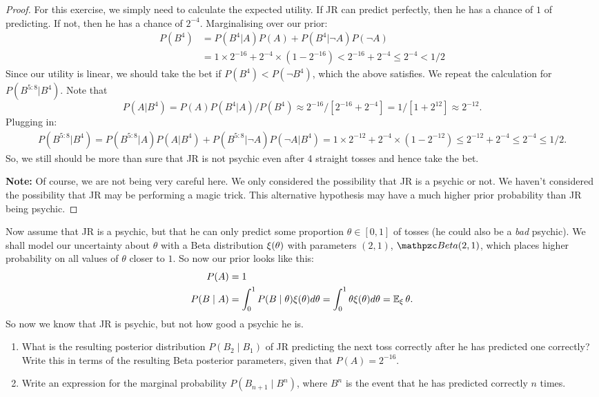 \documentclass[twoside,a4paper]{article}
\begin{document}
\begin{proof}
  For this exercise, we simply need to calculate the expected utility. If JR can predict perfectly, then he has a chance of $1$ of predicting. If not, then he has a chance of $2^{-4}$. Marginalising over our prior:
  \begin{align*}
    P(B^4) &= P(B^4 | A) P(A) + P(B^4 | \neg A) P(\neg A)\\
             &=  1 \times 2^{-16} + 2^{-4} \times (1 - 2^{-16}) < 2^{-16} + 2^{-4} \leq 2^{-4} < 1/2
  \end{align*}
  Since our utility is linear, we should take the bet if $P(B^4) < P(\neg B^{4})$, which the above satisfies. We repeat the calculation for $P(B^{5:8} | B^4)$. Note that
  \[
    P(A | B^4) = P(A) P(B^4 | A) / P(B^4) \approx 2^{-16} /[2^{-16} + 2^{-4}] = 1 / [1 + 2^{12}] \approx 2^{-12}.
  \]
  Plugging in:
  \begin{align*}
    P(B^{5:8} | B^4) = P(B^{5:8} | A) P(A | B^4) + P(B^{5:8} | \neg A) P(\neg A | B^4) =  1 \times 2^{-12} + 2^{-4} \times (1 - 2^{-12}) \leq 2^{-12} + 2^{-4} \leq 2^{-4} \leq 1/2.
  \end{align*}
  So, we still should be more than sure that JR is not psychic even after 4 straight tosses and hence take the bet.

  \textbf{Note:} Of course, we are not being very careful here. We only considered the possibility that JR is a psychic or not. We haven't considered the possibility that JR may be performing a magic trick. This alternative hypothesis may have a much higher prior probability than JR being psychic.
  
\end{proof}

\begin{exercise}
  Now assume that JR is a psychic, but that he can only predict some proportion $\theta \in [0,1]$ of tosses (he could also be a \emph{bad} psychic).
We shall model our uncertainty about $\theta$ with a Beta distribution $\xi(\theta)$ with parameters $(2, 1)$, $\Beta(2,1)$, which places higher probability on all values of $\theta$ closer to $1$. So now our prior looks like this:
\begin{align}
  P(A) &= 1\\
  P(B \mid A) &= \int_0^1 P(B \mid \theta) \xi(\theta) d\theta = \int_0^1 \theta \xi(\theta) d\theta = \mathop{\mbox{\ensuremath{\mathbb{E}}}}\nolimits_\xi \theta.\\
\end{align}
So now we know that JR is psychic, but not how good a psychic he is.
\begin{enumerate}
\item What is the resulting posterior distribution $P(B_2 \mid B_1)$ of JR predicting the next toss correctly after he has predicted one correctly? Write this in terms of the resulting Beta posterior parameters, given that $P(A) = 2^{-16}$.
\item Write an expression for the marginal probability $P(B_{n+1} \mid B^n)$, where $B^n$ is the event that he has predicted correctly $n$ times.
\end{enumerate}

\end{exercise}
\end{document}
